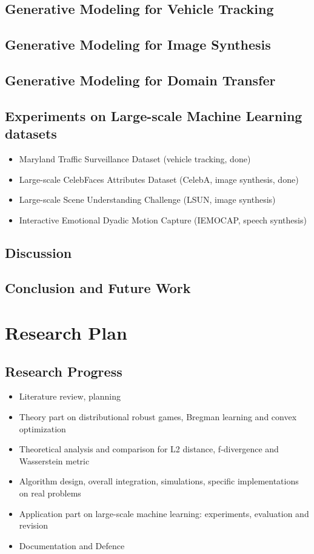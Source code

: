\documentclass{article}
\begin{document}
\subsection{Generative Modeling for Vehicle Tracking}
\subsection{Generative Modeling for Image Synthesis}
\subsection{Generative Modeling for Domain Transfer}

\subsection{Experiments on Large-scale Machine Learning datasets}
\begin{itemize}
\item Maryland Traffic Surveillance Dataset (vehicle tracking, done)
\item Large-scale CelebFaces Attributes Dataset (CelebA, image synthesis, done)
\item Large-scale Scene Understanding Challenge (LSUN, image synthesis)
\item Interactive Emotional Dyadic Motion Capture (IEMOCAP, speech synthesis)
\end{itemize}

\subsection{Discussion}

\subsection{Conclusion and Future Work}



\section{Research Plan}
\label{Sec:Plan}

\subsection{Research Progress}
\begin{itemize}
\item[] Literature review, planning
\item[] Theory part on distributional robust games, Bregman learning and convex optimization
\item[] Theoretical analysis and comparison for L2 distance, f-divergence and Wasserstein metric
\item[] Algorithm design, overall integration, simulations, specific implementations on real problems
\item[] Application part on large-scale machine learning: experiments, evaluation and revision
\item[] Documentation and Defence
\end{itemize}
\end{document}
